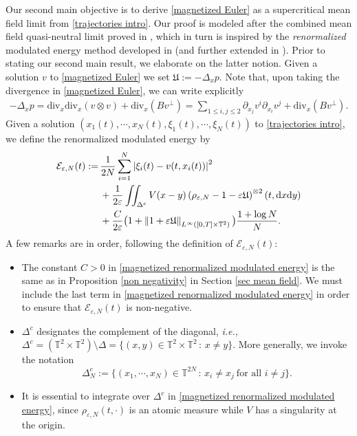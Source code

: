 \documentclass[11pt,reqno]{amsart}
\numberwithin{equation}{section}
\def\dd{{\rm d}}
\begin{document}
Our second main objective is to derive \eqref{magnetized Euler} as a supercritical mean field limit from \eqref{trajectories intro}. Our proof is modeled after the combined mean field quasi-neutral limit proved in \cite{han2021newton}, which in turn is inspired by the \textit{renormalized} modulated energy method developed in \cite{duerinckx2020mean} (and further extended in \cite{bresch2020modulated}). Prior to stating our second main result, we elaborate on the latter notion. 
Given a solution $v$ to \eqref{magnetized Euler} we set $\mathfrak{U}:= -\Delta_{x} p$. 
Note that, upon taking the divergence in \eqref{magnetized Euler}, 
we can write explicitly 
\begin{align*}
-\Delta_{x}p=\mathrm{div}_{x}\mathrm{div}_{x}(v\otimes v)+\mathrm{div}_{x}(Bv^{\perp})
=\sum_{1\leq i,j\leq 2}\partial_{x_{j}}v^{i}\partial_{x_{i}}v^{j}+\mathrm{div}_{x}(Bv^{\perp}). 
\end{align*}
Given a solution $(x_{1}(t),\cdots\!,x_{N}(t),\xi_{1}(t),\cdots\!,\xi_{N}(t))$ 
to \eqref{trajectories intro}, we define the renormalized modulated energy by  
\begin{align}
\mathcal{E}_{\varepsilon,N}(t):=
&\, \frac{1}{2N}\sum_{i=1}^{N}\left\vert \xi_{i}(t)-v(t,x_{i}(t))\right\vert^{2} \notag\\
&\,+\frac{1}{2\varepsilon}
\iint_{\Delta^{c}}V(x-y)\left(\rho_{\varepsilon,N}-1-\varepsilon \mathfrak{U}\right)^{\otimes 2}(t,\dd x\dd y) \notag\\
&\,+\frac{C}{2\varepsilon}\big(1+\left\Vert 1+\varepsilon\mathfrak{U} \right\Vert_{L^\infty([0,T]\times\mathbb T^2)}\big)
\frac{1+\log N}{N}.
\label{magnetized renormalized modulated energy}       
\end{align} 
A few remarks are in order, following the definition of  $\mathcal{E}_{\varepsilon,N}(t)$: 
\begin{itemize}
    \item[{\rm(a)}] The constant $C>0$ in \eqref{magnetized renormalized modulated energy}
    is the same as in Proposition \ref{non negativity} in Section \ref{sec mean field}. We must include the last term in \eqref{magnetized renormalized modulated energy} in order to ensure that $\mathcal{E}_{\varepsilon,N}(t)$ is non-negative.
    \item[{\rm(b)}]  $\Delta^{c}$ designates the complement of the diagonal, {\it i.e.}, 
    $\Delta^{c}=(\mathbb{T}^{2}\times \mathbb{T}^{2})\setminus \Delta=\{(x,y)\in \mathbb{T}^{2}\times \mathbb{T}^{2}\,:\, x\neq y\}$. 
    More generally, we invoke the notation 
    $$
    \Delta_{N}^{c}:=\{(x_{1},\cdots\!,x_{N})\in \mathbb{T}^{2N}\,:\, x_i\neq x_j\ \text{for all } i\neq j\}.
    $$
    \item[{\rm(c)}]  It is essential to integrate over $\Delta^{c}$ 
    in \eqref{magnetized renormalized modulated energy}, 
    since $\rho_{\varepsilon,N}(t,\cdot)$ is an atomic measure while $V$ has a singularity at the origin.
\end{itemize}
\end{document}
